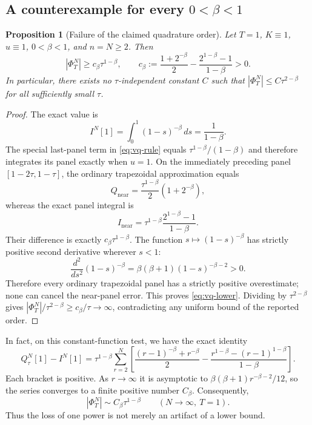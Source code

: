 \documentclass[11pt]{amsart}
\numberwithin{equation}{section}
\newtheorem{proposition}{Proposition}[section]
\theoremstyle{remark}
\newcommand{\abs}[1]{\left\lvert #1\right\rvert}
\begin{document}
\subsection{A counterexample for every $0<\beta<1$}
\begin{proposition}[Failure of the claimed quadrature order]\label{prop:vq-lower}
Let $T=1$, $K\equiv1$, $u\equiv1$, $0<\beta<1$, and $n=N\geq2$.
Then
\begin{equation}\label{eq:vq-lower}
\abs{\Phi_T^N}\geq c_\beta\tau^{1-\beta},\qquad
c_\beta:=\frac{1+2^{-\beta}}2-\frac{2^{1-\beta}-1}{1-\beta}>0.
\end{equation}
In particular, there exists no $\tau$-independent constant $C$ such that
$\abs{\Phi_T^N}\leq C\tau^{2-\beta}$ for all sufficiently small $\tau$.
\end{proposition}
\begin{proof}
The exact value is
\[
I^N[1]=\int_0^1(1-s)^{-\beta}\,ds=\frac1{1-\beta}.
\]
The special last-panel term in \eqref{eq:vq-rule} equals
$\tau^{1-\beta}/(1-\beta)$ and therefore integrates its panel exactly when
$u=1$. On the immediately preceding panel $[1-2\tau,1-\tau]$, the ordinary
trapezoidal approximation equals
\[
Q_{\mathrm{near}}=\frac{\tau^{1-\beta}}2(1+2^{-\beta}),
\]
whereas the exact panel integral is
\[
I_{\mathrm{near}}=\tau^{1-\beta}\frac{2^{1-\beta}-1}{1-\beta}.
\]
Their difference is exactly $c_\beta\tau^{1-\beta}$. The function
$s\mapsto(1-s)^{-\beta}$ has strictly positive second derivative wherever
$s<1$:
\[
\frac{d^2}{ds^2}(1-s)^{-\beta}=\beta(\beta+1)(1-s)^{-\beta-2}>0.
\]
Therefore every ordinary trapezoidal panel has a strictly positive
overestimate; none can cancel the near-panel error. This proves
\eqref{eq:vq-lower}. Dividing by $\tau^{2-\beta}$ gives
$\abs{\Phi_T^N}/\tau^{2-\beta}\geq c_\beta/\tau\to\infty$, contradicting
any uniform bound of the reported order.
\end{proof}
In fact, on this constant-function test, we have the exact identity
\begin{equation}\label{eq:vq-series}
Q_\tau^N[1]-I^N[1]=\tau^{1-\beta}\sum_{r=2}^N
\left[\frac{(r-1)^{-\beta}+r^{-\beta}}2
-\frac{r^{1-\beta}-(r-1)^{1-\beta}}{1-\beta}\right].
\end{equation}
Each bracket is positive. As $r\to\infty$ it is asymptotic to
$\beta(\beta+1)r^{-\beta-2}/12$, so the series converges to a finite positive
number $C_\beta$. Consequently,
\begin{equation}\label{eq:vq-asymptotic}
\abs{\Phi_T^N}\sim C_\beta\tau^{1-\beta}\qquad(N\to\infty,\ T=1).
\end{equation}
Thus the loss of one power is not merely an artifact of a lower bound.
\end{document}
